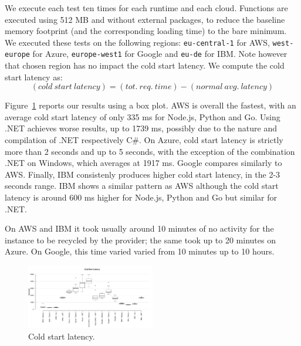 We execute each test ten times for each runtime and each cloud. 
Functions are executed using 512 \gls{MB} and without external packages, to reduce the baseline memory footprint (and the corresponding loading time) to the bare minimum.
We executed these tests on the following regions: \texttt{eu-central-1} for AWS,  \texttt{west-europe} for Azure,  \texttt{europe-west1} for Google and \texttt{eu-de} for IBM. 
Note however that chosen region has no impact the cold start latency. 
We compute the cold start latency as:
\begin{equation*}
(cold\ start\ latency) = (tot.\ req.\ time) - (normal\ avg.\ latency)
\end{equation*}

Figure~\ref{fig:coldstart_plot} reports our results using a box plot.
 \gls{AWS} is overall the fastest, with an average cold start latency of only 335 ms for Node.js, Python and Go. 
Using .NET achieves worse results, up to 1739 ms, possibly due to the nature and compilation of .NET respectively C\#. 
On Azure, cold start latency is strictly more than 2 seconds and up to 5 seconds, with the exception of the combination .NET on Windows, which averages at 1917 ms. 
Google compares similarly to \gls{AWS}.
Finally, \gls{IBM} consistenly produces  higher cold start latency, in the 2-3 seconds range. 
\gls{IBM} shows a similar pattern   as \gls{AWS} although the cold start latency is around 600 ms higher for Node.js, Python and Go but similar for .NET.

 
On \gls{AWS} and \gls{IBM} it took usually around 10 minutes of no activity for the instance to be recycled by the provider; the same took up to 20 minutes on Azure. 
On Google, this time varied varied from 10 minutes up to 10 hours.

\begin{figure}[!t]
\centering
\includegraphics[width=0.5\textwidth]{bilder/cold_start/boxplot_coldstart_all.pdf}
\caption{Cold start latency.}
\label{fig:coldstart_plot}
\end{figure}



